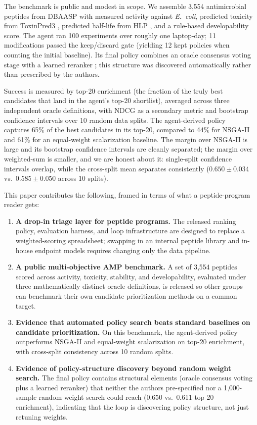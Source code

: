 The benchmark is public and modest in scope.
We assemble 3{,}554 antimicrobial peptides from DBAASP \citep{pirtskhalava2021dbaasp} with measured activity against \emph{E.~coli}, predicted toxicity from ToxinPred3 \citep{rathore2024toxinpred3}, predicted half-life from HLP \citep{sharma2014hlp}, and a rule-based developability score.
The agent ran 100 experiments over roughly one laptop-day; 11 modifications passed the keep/discard gate (yielding 12 kept policies when counting the initial baseline).
Its final policy combines an oracle consensus voting stage with a learned reranker \citep{burges2010ranknet,ke2017lightgbm}; this structure was discovered automatically rather than prescribed by the authors.

Success is measured by top-20 enrichment (the fraction of the truly best candidates that land in the agent's top-20 shortlist), averaged across three independent oracle definitions, with NDCG as a secondary metric and bootstrap confidence intervals over 10 random data splits.
The agent-derived policy captures 65\% of the best candidates in its top-20, compared to 44\% for NSGA-II and 61\% for an equal-weight scalarization baseline.
The margin over NSGA-II is large and its bootstrap confidence intervals are cleanly separated; the margin over weighted-sum is smaller, and we are honest about it: single-split confidence intervals overlap, while the cross-split mean separates consistently ($0.650 \pm 0.034$ vs.\ $0.585 \pm 0.050$ across 10 splits).

This paper contributes the following, framed in terms of what a peptide-program reader gets:
\begin{enumerate}[nosep]
\item \textbf{A drop-in triage layer for peptide programs.}
The released ranking policy, evaluation harness, and loop infrastructure are designed to replace a weighted-scoring spreadsheet; swapping in an internal peptide library and in-house endpoint models requires changing only the data pipeline.

\item \textbf{A public multi-objective AMP benchmark.}
A set of 3{,}554 peptides scored across activity, toxicity, stability, and developability, evaluated under three mathematically distinct oracle definitions, is released so other groups can benchmark their own candidate prioritization methods on a common target.

\item \textbf{Evidence that automated policy search beats standard baselines on candidate prioritization.}
On this benchmark, the agent-derived policy outperforms NSGA-II and equal-weight scalarization on top-20 enrichment, with cross-split consistency across 10 random splits.

\item \textbf{Evidence of policy-structure discovery beyond random weight search.}
The final policy contains structural elements (oracle consensus voting plus a learned reranker) that neither the authors pre-specified nor a 1{,}000-sample random weight search could reach (0.650 vs.\ 0.611 top-20 enrichment), indicating that the loop is discovering policy structure, not just retuning weights.
\end{enumerate}
